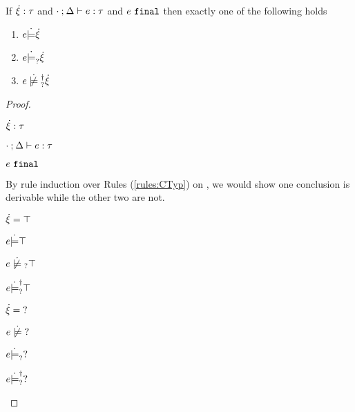 \begin{theorem}
  \label{thrm:exclusive-constraint-satisfaction}
  If $\dot{\xi} : \tau$ and $\cdot \mathbin{;} \Delta \vdash e : \tau$ and $e ~\mathtt{final}$ then exactly one of the following holds
  \begin{enumerate}
    \item $e \dot{\models} \dot{\xi}$
    \item $e \dot{\models}_{?} \dot{\xi}$
    \item $\cnotsatisfyormay{e}{\hxi}$
  \end{enumerate}
\end{theorem}
\begin{proof}
\begin{pfsteps*}
\item $\dot{\xi} : \tau$  
\item $\cdot \mathbin{;} \Delta \vdash e : \tau$  
\item $e ~\mathtt{final}$  
\end{pfsteps*}
By rule induction over Rules (\ref{rules:CTyp}) on , we would show one conclusion is derivable while the other two are not.
\begin{byCases}

\item[\text{(\ref{rule:CTTruth})}]
    \begin{pfsteps*}
    \item $\dot{\xi}=\top$ 
    \item $e \dot{\models} \top$  
    \item $\cnotmaysatisfy{e}{\ctruth}$ 
    \item $e \dot{\models}_{?}^{\dag} \top$ 
    \end{pfsteps*}
    
\item[\text{(\ref{rule:CTUnknown})}]
    \begin{pfsteps*}
    \item $\dot{\xi}=\mathtt{?}$ 
    \item $\cnotsatisfy{e}{\cunknown}$ 
    \item $e \dot{\models}_{?} \mathtt{?}$  
    \item $e \dot{\models}_{?}^{\dag} \mathtt{?}$  
    \end{pfsteps*}
    

\end{byCases}
\end{proof}
